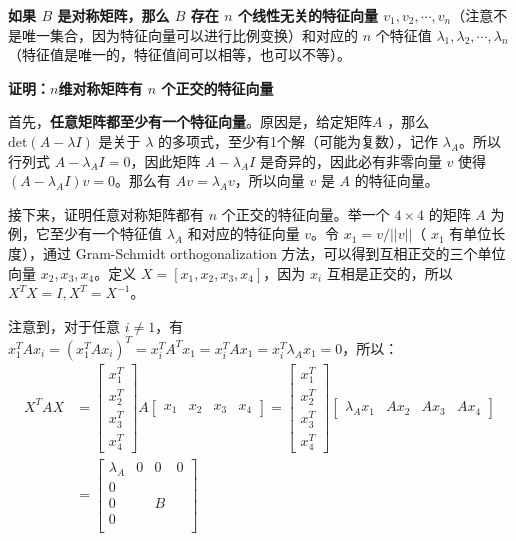 \documentclass[12pt]{article}
\begin{document}
\textbf{如果 $B$ 是对称矩阵，那么 $B$ 存在 $n$ 个线性无关的特征向量 $v_1, v_2, \cdots, v_n$}（注意不是唯一集合，因为特征向量可以进行比例变换）和对应的 $n$ 个特征值 $\lambda_1, \lambda_2, \cdots, \lambda_n$（特征值是唯一的，特征值间可以相等，也可以不等）。

\begin{framed}
\textbf{证明：$n$维对称矩阵有 $n$ 个正交的特征向量}

首先，\textbf{任意矩阵都至少有一个特征向量}。原因是，给定矩阵$A$ ，那么 $\text{det}(A - \lambda I)$ 是关于 $\lambda$ 的多项式，至少有1个解（可能为复数），记作 $\lambda_A$。所以行列式 $A - \lambda_AI = 0$，因此矩阵 $A - \lambda_AI$ 是奇异的，因此必有非零向量 $v$ 使得 $(A - \lambda_AI)v = 0$。那么有 $Av = \lambda_Av$，所以向量 $v$ 是 $A$ 的特征向量。

接下来，证明任意对称矩阵都有 $n$ 个正交的特征向量。举一个 $4 \times 4$ 的矩阵 $A$ 为例，它至少有一个特征值 $\lambda_A$ 和对应的特征向量 $v$。令 $x_1 = v / ||v||$（ $x_1$ 有单位长度），通过 Gram-Schmidt orthogonalization 方法，可以得到互相正交的三个单位向量 $x_2, x_3, x_4$。定义 $X = [x_1, x_2, x_3, x_4]$，因为 $x_i$ 互相是正交的，所以 $X^TX = I, X^T = X^{-1}$。

注意到，对于任意 $i \neq 1$，有 $x_1^TAx_i = (x_1^TAx_i)^T = x_i^TA^Tx_1 = x_i^TAx_1  =  x_i^T \lambda_Ax_1 = 0$，所以：
\begin{align*}
X^TAX &= \begin{bmatrix}x_1^T \\ x_2^T \\ x_3^T \\ x_4^T \end{bmatrix} A \begin{bmatrix}x_1 & x_2 & x_3 & x_4 \end{bmatrix} =  \begin{bmatrix}x_1^T \\ x_2^T \\ x_3^T \\ x_4^T \end{bmatrix} \begin{bmatrix} \lambda_Ax_1 & Ax_2 & Ax_3 & Ax_4 \end{bmatrix} \\
           &= 
\begin{bmatrix}
\lambda_A & 0 & 0 & 0 \\
0 & & & \\
0 & & B & \\
0 & & & \\
\end{bmatrix}
\end{align*}


\end{framed}
\end{document}

